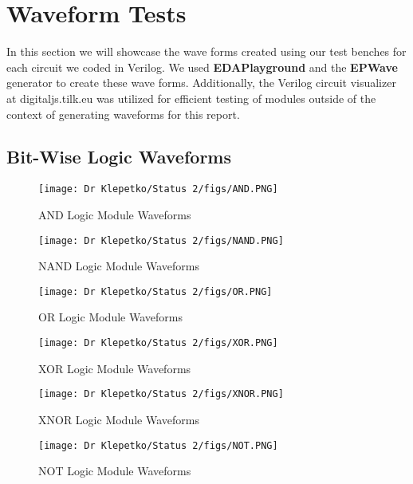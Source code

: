 \documentclass[12pt]{article}
\begin{document}
\newpage

\section{Waveform Tests}

In this section we will showcase the wave forms created using our test benches for each circuit we coded in Verilog. We used \textbf{EDAPlayground} and the \textbf{EPWave} generator to create these wave forms. Additionally, the Verilog circuit visualizer at digitaljs.tilk.eu was utilized for efficient testing of modules outside of the context of generating waveforms for this report.\\

\subsection{Bit-Wise Logic Waveforms}
\begin{figure}[H]
    \centering
    \texttt{[image: Dr Klepetko/Status 2/figs/AND.PNG]}
    \caption{AND Logic Module Waveforms}
    \label{fig:enter-label}
\end{figure}

\begin{figure}[H]
    \centering
    \texttt{[image: Dr Klepetko/Status 2/figs/NAND.PNG]}
    \caption{NAND Logic Module Waveforms}
    \label{fig:enter-label}
\end{figure}

\begin{figure}[H]
    \centering
    \texttt{[image: Dr Klepetko/Status 2/figs/OR.PNG]}
    \caption{OR Logic Module Waveforms}
    \label{fig:enter-label}
\end{figure}

\begin{figure}[H]
    \centering
    \texttt{[image: Dr Klepetko/Status 2/figs/XOR.PNG]}
    \caption{XOR Logic Module Waveforms}
    \label{fig:enter-label}
\end{figure}

\begin{figure}[H]
    \centering
    \texttt{[image: Dr Klepetko/Status 2/figs/XNOR.PNG]}
    \caption{XNOR Logic Module Waveforms}
    \label{fig:enter-label}
\end{figure}

\begin{figure}[H]
    \centering
    \texttt{[image: Dr Klepetko/Status 2/figs/NOT.PNG]}
    \caption{NOT Logic Module Waveforms}
    \label{fig:enter-label}
\end{figure}
\end{document}
